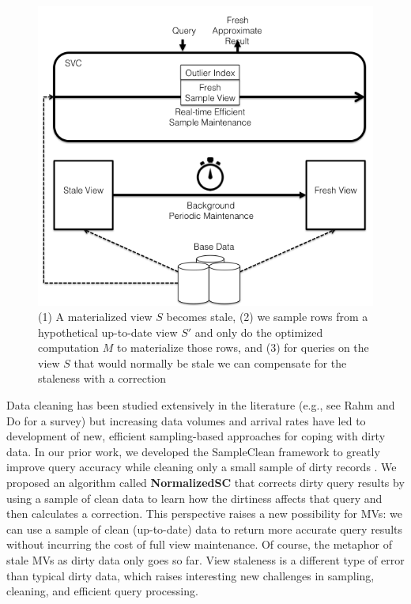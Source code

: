 \begin{figure}[t] \vspace{-2em}
\centering
 \includegraphics[scale=0.30]{figs/sys-arch.png} \vspace{-.25em}
 \caption{(1) A materialized view $S$ becomes stale, (2) we sample rows from a hypothetical up-to-date view $S'$ and only do the optimized computation $M$ to materialize those rows, and (3) for queries on the view $S$ that would normally be stale we can compensate for the staleness with a correction  \label{sys-arch}}\vspace{-1.75em}
\end{figure}

Data cleaning has been studied extensively in the literature (e.g., see Rahm and Do for a survey\cite{rahm2000data}) but increasing data volumes and arrival rates have led to development of new, efficient sampling-based approaches for coping with dirty data.   
In our prior work, we developed the SampleClean framework to greatly improve query accuracy while cleaning only a small sample of dirty records \cite{wang1999sample}.  
We proposed an algorithm called \textbf{NormalizedSC} that corrects dirty query results by using a sample of clean data to learn how the dirtiness affects that query and then calculates a correction.  
This perspective raises a new possibility for MVs: we can use a sample of clean (up-to-date) data to return more accurate query results without incurring the cost of full view maintenance.
Of course, the metaphor of stale MVs as dirty data only goes so far. 
View staleness is a different type of error than typical dirty data, which raises interesting new challenges in sampling, cleaning, and efficient query processing.

